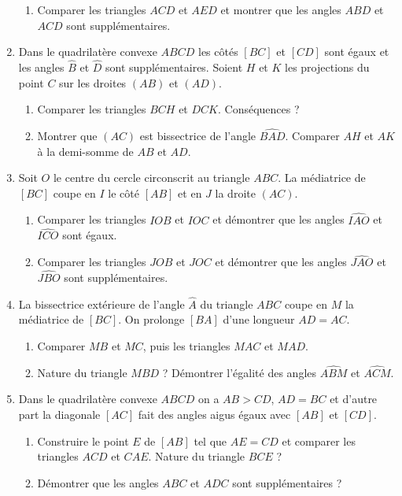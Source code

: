 \documentclass[12 pt]{report}
\theoremstyle{plain}
\newcounter{n}
\begin{document}
\begin{enumerate}
\begin{enumerate}
\item Comparer les triangles $ACD$ et $AED$ et montrer que les angles $ABD$ et $ACD$
sont supplémentaires. 
\end{enumerate}
\item Dans le quadrilatère convexe $ABCD$ les côtés $[BC]$ et $[CD]$ sont égaux 
et les angles $\widehat{B}$ et $\widehat{D}$ sont supplémentaires. Soient $H$ et $K$
les projections du point $C$ sur les droites $(AB)$ et $(AD)$.
\begin{enumerate}
\item Comparer les triangles $BCH$ et $DCK$. Conséquences ?
\item Montrer que $(AC)$ est bissectrice de l'angle $\widehat{BAD}$. Comparer $AH$
et $AK$ à la demi-somme de $AB$ et $AD$.
\end{enumerate}
\item Soit $O$ le centre du cercle circonscrit au triangle $ABC$. La médiatrice 
de $[BC]$ coupe en $I$ le côté $[AB]$ et en $J$ la droite $(AC)$.\begin{enumerate}
\item Comparer les triangles $IOB$ et $IOC$ et démontrer que les angles
$\widehat{IAO}$ et $\widehat{ICO}$ sont égaux.
\item Comparer les triangles $JOB$ et $JOC$ et démontrer que les angles $\widehat{JAO}$ et $\widehat{JBO}$ sont supplémentaires.
\end{enumerate}
\item La bissectrice extérieure de l'angle $\widehat{A}$ du triangle $ABC$ coupe en $M$ la médiatrice de $[BC]$. On prolonge $[BA]$ d'une longueur $AD=AC$.\begin{enumerate}
\item Comparer $MB$ et $MC$, puis les triangles $MAC$ et $MAD$.
\item Nature du triangle $MBD$ ? Démontrer l'égalité des angles $\widehat{ABM}$ et 
$\widehat{ACM}$.
\end{enumerate}
\item Dans le quadrilatère convexe $ABCD$ on a $AB>CD$, $AD=BC$ et d'autre part la 
diagonale $[AC]$ fait des angles aigus égaux avec $[AB]$ et $[CD]$. 
\begin{enumerate}
\item Construire le point $E$ de $[AB]$ tel que $AE=CD$ et comparer les triangles $ACD$ et $CAE$. Nature du triangle $BCE$ ? 
\item Démontrer que les angles $ABC$ et $ADC$ sont supplémentaires ? 
\end{enumerate}

\end{enumerate}
\end{document}
